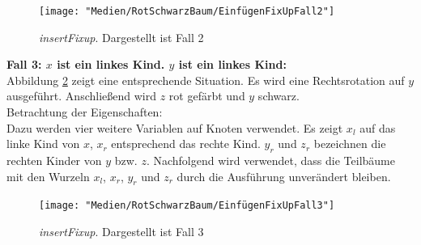 \documentclass[a4paper,12pt]{article}
\begin{document}
\begin{figure}[H]
	\centering
	\texttt{[image: "Medien/RotSchwarzBaum/EinfügenFixUpFall2"]}
	\caption{\textit{insertFixup}. Dargestellt ist Fall 2  }
	\label{fig:EinfügenFixUpFall2}
\end{figure}

\noindent\textbf{Fall 3: $x$ ist ein linkes Kind. $y$ ist ein linkes Kind: }\\
\noindent Abbildung \ref{fig:EinfügenFixUpFall3} zeigt eine entsprechende Situation. Es wird eine Rechtsrotation auf $y$ ausgeführt. Anschließend wird $z$ rot gefärbt und $y$ schwarz. \\

\noindent Betrachtung der Eigenschaften:\\
\noindent Dazu werden vier weitere Variablen auf Knoten verwendet. Es zeigt $x_l$ auf das linke Kind von $x$,  $x_r$ entsprechend das rechte Kind. $y_r$ und $z_r$ bezeichnen die rechten Kinder von $y$ bzw. $z$. Nachfolgend wird verwendet, dass die Teilbäume mit den Wurzeln $x_l$, $x_r$, $y_r$ und $z_r$ durch die Ausführung unverändert bleiben.
\begin{figure}[H]
	\centering
	\texttt{[image: "Medien/RotSchwarzBaum/EinfügenFixUpFall3"]}
	\caption{\textit{insertFixup}. Dargestellt ist Fall 3  }
	\label{fig:EinfügenFixUpFall3}
\end{figure}
\end{document}
